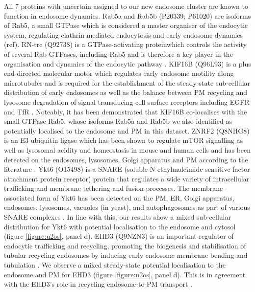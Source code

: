 \documentclass[12pt,english]{article}
\begin{document}
All 7 proteins with uncertain assigned to our new endosome cluster are known to function in endosome dynamics. Rab5a and Rab5b (P20339; P61020) are isoforms of Rab5, a small GTPase which is considered a master organiser of the endocytic system, regulating clathrin-mediated endocytosis and early endosome dynamics (ref). RN-tre (Q92738) is a GTPase-activating proteinwhich controls the activity of several Rab GTPases, including Rab5 and is therefore a key player in the organisation and dynamics of the endocytic pathway \citep{Lanzetti::2000, Gautreau::2014}. KIF16B (Q96L93) is a plus end-directed molecular motor which regulates early endosome motility along microtubules and is required for the establishment of the steady-state sub-cellular distribution of early endosomes as well as the balance between PM recycling and lysosome degradation of signal transducing cell surface receptors including EGFR and TfR \citep{Hoepfner:2005, Carlucci::2010}. Noteably, it has been demonstrated that KIF16B co-localises with the small GTPase Rab5, whose isoforms Rab5a and Rab5b we also identified as potentially localised to the endosome and PM in this dataset. ZNRF2 (Q8NHG8) is an E3 ubiquitin ligase which has been shown to regulate mTOR signalling as well as lysosomal acidity and homeostasis in mouse and human cells and has been detected on the endosomes, lysosomes, Golgi apparatus and PM according to the literature \citep{Araki:2003, Hoxhaj:2016}. Ykt6 (O15498) is a SNARE (soluble N-ethylmaleimide-sensitive factor attachment protein receptor) protein that regulates a wide variety of intracellular trafficking and membrane tethering and fusion processes. The membrane-associated form of Ykt6 has been detected on the PM, ER, Golgi apparatus, endosomes, lysosomes, vacuoles (in yeast), and autophagosomes as part of various SNARE complexes \citep{Dilcher::2001, Tai:2004,Fukasawa::2004,Meiringer::2008, Takats::2018, Matsui::2018, Linnemannstons::2018, Yong::2019}. In line with this, our results show a mixed sub-cellular distribution for Ykt6 with potential localisation to the endosome and cytosol (figure \ref{figure:u2os}, panel d). EHD3 (Q9NZN3) is an important regulator of endocytic trafficking and recycling, promoting the biogenesis and stabilisation of tubular recycling endosomes by inducing early endosome membrane bending and tubulation \citep{Bahl::2016,Henmi::2016}. We observe a mixed steady-state potential localisation to the endosome and PM for EHD3 (figure \ref{figure:u2os}, panel d). This is in agreement with the EHD3's role in recycling endosome-to-PM transport \citep{Naslavsky::2006,Naslavsky::2009,George::2007,Cabasso::2015, Henmi::2016}.
\end{document}
